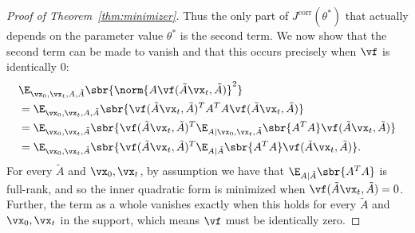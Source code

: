 \documentclass{article}
\begin{document}
\begin{proof}[Proof of Theorem~\ref{thm:minimizer}]
    
    Thus the only part of $J^{\mathrm{corr}}(\theta^*)$ that actually depends on the parameter value $\theta^*$ is the second term. We now show that the second term can be made to vanish and that this occurs precisely when $\vf$ is identically 0: \begin{align*}
        &\E_{\vx_0, \vx_t, A, \tilde{A}} \sbr{ \norm{ A\vf(\tilde{A} \vx_t, \tilde{A}) }^2 } \\
        &= \E_{\vx_0, \vx_t, A, \tilde{A}} \sbr{ \vf(\tilde{A} \vx_t, \tilde{A})^T A^T A \vf(\tilde{A} \vx_t, \tilde{A}) } \\
        &= \E_{\vx_0, \vx_t, \tilde{A}} \sbr{ \vf(\tilde{A} \vx_t, \tilde{A})^T \E_{A | \vx_0, \vx_t, \tilde{A}} \sbr{A^T A} \vf(\tilde{A} \vx_t, \tilde{A}) } \\
        &= \E_{\vx_0, \vx_t, \tilde{A}} \sbr{ \vf(\tilde{A} \vx_t, \tilde{A})^T \E_{A | \tilde{A}} \sbr{A^T A} \vf(\tilde{A} \vx_t, \tilde{A}) }.
    \end{align*} For every $\tilde{A}$ and $\vx_0, \vx_t$, by assumption we have that $\E_{A | \tilde{A}} \sbr{A^T A}$ is full-rank, and so the inner quadratic form is minimized when $\vf(\tilde{A} \vx_t, \tilde{A}) = 0$. Further, the term as a whole vanishes exactly when this holds for every $\tilde{A}$ and $\vx_0, \vx_t$ in the support, which means $\vf$ must be identically zero.
\end{proof}
\end{document}
